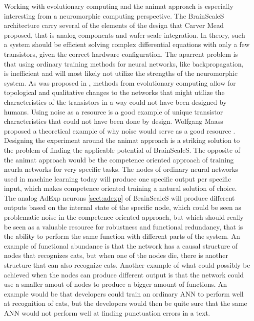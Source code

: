 Working with evolutionary computing and the animat approach is especially interesting from a neuromorphic computing perspective.
The BrainScaleS architecture carry several of the elements of the design that Carver Mead proposed, that is analog components and wafer-scale integration.
In theory, such a system should be efficient solving complex differential equations with only a few transistors, given the correct hardware configuration.
The aparrent problem is that using ordinary training methods for neural networks, like backpropagation, is inefficient and will most likely not utilize the strengths of the neuromorphic system.
As was proposed in \cite{schuman_evolutionary_2016}, methods from evolutionary computing allow for topological and qualitative changes to the networks that might utilize the characteristics of the transistors in a way could not have been designed by humans.
Using noise as a resource is a good example of unique transistor characteristics that could not have been done by design.
Wolfgang Maass proposed a theoretical example of why noise would serve as a good resource \cite{maass_noise_2014}.
Designing the experiment around the animat approach is a striking solution to the problem of finding the applicable potential of BrainScaleS.
The opposite of the animat approach would be the competence oriented approach of training neurla networks for very specific tasks.
The nodes of ordinary neural networks used in machine learning today will produce one specific output per specific input, which makes competence oriented training a natural solution of choice.
The analog AdExp neurons \vref{sect:adexp} of BrainScaleS will produce different outputs based on the internal state of the specific node, which could be seen as problematic noise in the competence oriented approach, but which should really be seen as a valuable resource for robustness and functional redundancy, that is the ability to perform the same function with different parts of the system.
An example of functional abundance is that the network has a causal structure of nodes that recognizes cats, but when one of the nodes die, there is another structure that can also recognize cats.
Another example of what could possibly be achieved when the nodes can produce different output is that the network could use a smaller amout of nodes to produce a bigger amount of functions.
An example would be that developers could train an ordinary ANN to perform well at recognition of cats, but the developers would then be quite sure that the same ANN would not perform well at finding punctuation errors in a text.
